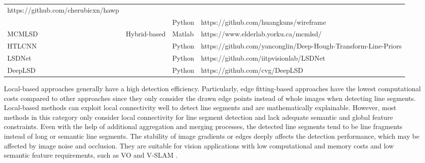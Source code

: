 \documentclass[journal,compsoc]{IEEEtran}
\begin{document}
\begin{table*}[tbp]
\begin{tabular}{|p{}<{\centering}|p{}<{\centering}|p{}<{\centering}|p{}<{\centering}|p{}<{\centering}|}
https://github.com/cherubicxn/hawp                                     \\ \cline{1-1} \cline{4-5}  		\cite{LearningtoParseWireframesinImagesofMan-MadeEnvironments}                              & \multicolumn{1}{c|}{}                                 &                                          & Python         & https://github.com/huangkuns/wireframe                                 \\ \hline 		MCMLSD \cite{MCMLSD}                                                                        & \multicolumn{2}{c|}{\multirow{4}{*}{Hybrid-based}}                                               & Matlab         & https://www.elderlab.yorku.ca/mcmlsd/                                  \\ \cline{1-1} \cline{4-5}  		HTLCNN \cite{DeepHoughTransformLinePriors}                                                 & \multicolumn{2}{c|}{}                                                                            & Python         & https://github.com/yanconglin/Deep-Hough-Transform-Line-Priors         \\ \cline{1-1} \cline{4-5}  		LSDNet \cite{LSDNet}                                                                        & \multicolumn{2}{c|}{}                                                                            & Python         & https://github.com/iitpvisionlab/LSDNet                                \\ \cline{1-1} \cline{4-5}  		DeepLSD \cite{DeepLSD}                                                                      & \multicolumn{2}{c|}{}                                                                            & Python         & https://github.com/cvg/DeepLSD                                         \\ \hline 	
	\end{tabular}%
	\label{line_detection_implementation} 
\end{table*}

Local-based approaches generally have a high detection efficiency. Particularly, edge fitting-based approaches \cite{EDLines,ELSED} have the lowest computational costs compared to other approaches since they only consider the drawn edge points instead of whole images when detecting line segments. Local-based methods can exploit local connectivity well to detect line segments and are mathematically explainable. However, most methods in this category only consider local connectivity for line segment detection and lack adequate semantic and global feature constraints. Even with the help of additional aggregation and merging processes, the detected line segments tend to be line fragments instead of long or semantic line segments. The stability of image gradients or edges deeply affects the detection performance, which may be affected by image noise and occlusion. They are suitable for vision applications with low computational and memory costs and low semantic feature requirements, such as VO \cite{9521248} and V-SLAM \cite{9856705}.
\end{document}
